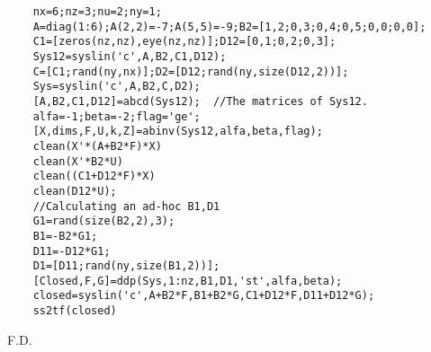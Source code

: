 \begin{examples}
  \begin{Verbatim}
    nx=6;nz=3;nu=2;ny=1;
    A=diag(1:6);A(2,2)=-7;A(5,5)=-9;B2=[1,2;0,3;0,4;0,5;0,0;0,0];
    C1=[zeros(nz,nz),eye(nz,nz)];D12=[0,1;0,2;0,3];
    Sys12=syslin('c',A,B2,C1,D12);
    C=[C1;rand(ny,nx)];D2=[D12;rand(ny,size(D12,2))];
    Sys=syslin('c',A,B2,C,D2);
    [A,B2,C1,D12]=abcd(Sys12);  //The matrices of Sys12.
    alfa=-1;beta=-2;flag='ge';
    [X,dims,F,U,k,Z]=abinv(Sys12,alfa,beta,flag);
    clean(X'*(A+B2*F)*X)
    clean(X'*B2*U)
    clean((C1+D12*F)*X)
    clean(D12*U);
    //Calculating an ad-hoc B1,D1
    G1=rand(size(B2,2),3);
    B1=-B2*G1;
    D11=-D12*G1;
    D1=[D11;rand(ny,size(B1,2))];
    [Closed,F,G]=ddp(Sys,1:nz,B1,D1,'st',alfa,beta);
    closed=syslin('c',A+B2*F,B1+B2*G,C1+D12*F,D11+D12*G);
    ss2tf(closed)
  \end{Verbatim}
\end{examples}
\begin{manseealso}
     
\end{manseealso}
\begin{authors}
  F.D.  
\end{authors}
